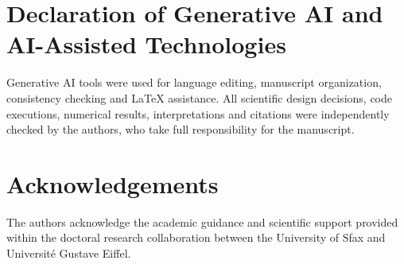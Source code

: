 \documentclass[runningheads,orivec]{llncs}
\newif\ifanon
\begin{document}
\section*{Declaration of Generative AI and AI-Assisted Technologies}

Generative AI tools were used for language editing, manuscript organization,
consistency checking and LaTeX assistance. All scientific design decisions, code
executions, numerical results, interpretations and citations were independently checked
by the authors, who take full responsibility for the manuscript.

\ifanon
\else
\section*{Acknowledgements}

The authors acknowledge the academic guidance and scientific support provided within
the doctoral research collaboration between the University of Sfax and Universit\'e
Gustave Eiffel.
\fi
\end{document}
